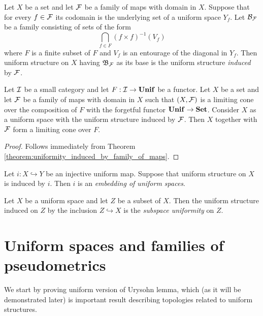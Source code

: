 \documentclass[10pt]{amsart}
\begin{document}
\begin{definition}
	Let $X$ be a set and let ${\mathcal F}$ be a family of maps with domain in $X$. Suppose that for every $f \in {\mathcal F}$ its codomain is the underlying set of a uniform space $Y_f$. Let ${\mathcal B}_{{\mathcal F}}$ be a family consisting of sets of the form
	$$\bigcap_{f\in F}\left(f\times f\right)^{-1}(V_f)$$
	where $F$ is a finite subset of $F$ and $V_f$ is an entourage of the diagonal in $Y_f$. Then uniform structure on $X$ having ${\mathfrak B}_{{\mathcal F}}$ as its base is the uniform structure \textit{induced} by ${\mathcal F}$.
\end{definition}

\begin{corollary}\label{corollary:limits_in_category_of_uniform_spaces}
	Let ${\mathcal I}$ be a small category and let $F:{\mathcal I} \rightarrow \mathbf{Unif}$ be a functor. Let $X$ be a set and let ${\mathcal F}$ be a family of maps with domain in $X$ such that $(X,{\mathcal F})$ is a limiting cone over the composition of $F$ with the forgetful functor $\mathbf{Unif} \rightarrow \mathbf{Set}$. Consider $X$ as a uniform space with the uniform structure induced by ${\mathcal F}$. Then $X$ together with ${\mathcal F}$ form a limiting cone over $F$.
\end{corollary}
\begin{proof}
	Follows immediately from Theorem \ref{theorem:uniformity_induced_by_family_of_maps}.
\end{proof}

\begin{definition}
	Let $i:X \hookrightarrow Y$ be an injective uniform map. Suppose that uniform structure on $X$ is induced by $i$. Then $i$ is an \textit{embedding of uniform spaces}.
\end{definition}

\begin{definition}
	Let $X$ be a uniform space and let $Z$ be a subset of $X$. Then the uniform structure induced on $Z$ by the inclusion $Z\hookrightarrow X$ is the \textit{subspace uniformity} on $Z$.
\end{definition}

\section{Uniform spaces and families of pseudometrics}
\noindent
We start by proving uniform version of Urysohn lemma, which (as it will be demonstrated later) is important result describing topologies related to uniform structures.
\end{document}
